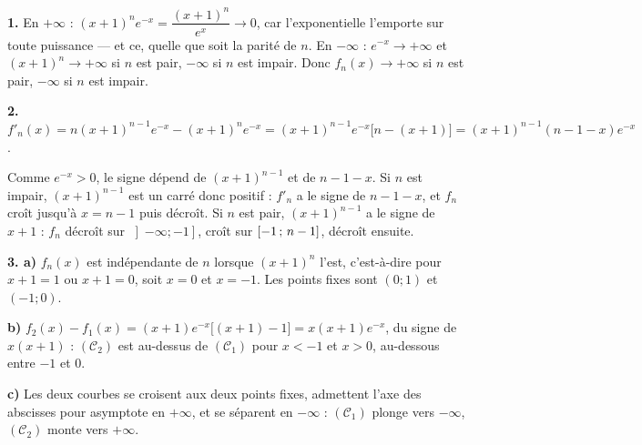 \begin{corrige}
\textbf{1.} En $+\infty$ : $(x+1)^{n}e^{-x} = \dfrac{(x+1)^{n}}{e^{x}} \to 0$,
car l'exponentielle l'emporte sur toute puissance — et ce, quelle que soit la
parité de $n$. En $-\infty$ : $e^{-x} \to +\infty$ et
$(x+1)^{n} \to +\infty$ si $n$ est pair, $-\infty$ si $n$ est impair. Donc
$f_{n}(x) \to +\infty$ si $n$ est pair, $-\infty$ si $n$ est impair.

\textbf{2.} $f'_{n}(x) = n(x+1)^{n-1}e^{-x} - (x+1)^{n}e^{-x}
= (x+1)^{n-1}e^{-x}\bigl[n-(x+1)\bigr] = (x+1)^{n-1}(n-1-x)e^{-x}$.

Comme $e^{-x}>0$, le signe dépend de $(x+1)^{n-1}$ et de $n-1-x$. Si $n$ est
impair, $(x+1)^{n-1}$ est un carré donc positif : $f'_{n}$ a le signe de
$n-1-x$, et $f_{n}$ croît jusqu'à $x = n-1$ puis décroît. Si $n$ est pair,
$(x+1)^{n-1}$ a le signe de $x+1$ : $f_{n}$ décroît sur
$\left]-\infty;-1\right]$, croît sur $\left[-1\,;\,n-1\right]$, décroît ensuite.

\textbf{3. a)} $f_{n}(x)$ est indépendante de $n$ lorsque $(x+1)^{n}$ l'est,
c'est-à-dire pour $x+1 = 1$ ou $x+1 = 0$, soit $x = 0$ et $x = -1$. Les points
fixes sont $(0;1)$ et $(-1;0)$.

\textbf{b)} $f_{2}(x)-f_{1}(x) = (x+1)e^{-x}\bigl[(x+1)-1\bigr] = x(x+1)e^{-x}$,
du signe de $x(x+1)$ : $(\mathscr{C}_{2})$ est au-dessus de
$(\mathscr{C}_{1})$ pour $x<-1$ et $x>0$, au-dessous entre $-1$ et $0$.

\textbf{c)} Les deux courbes se croisent aux deux points fixes, admettent
l'axe des abscisses pour asymptote en $+\infty$, et se séparent en $-\infty$ :
$(\mathscr{C}_{1})$ plonge vers $-\infty$, $(\mathscr{C}_{2})$ monte vers
$+\infty$.
\end{corrige}

